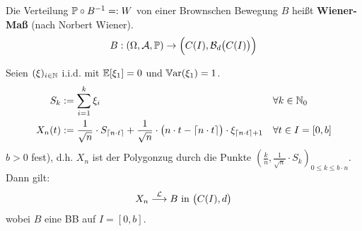 Die Verteilung $\P\circ B^{-1}=:W$ von  einer Brownschen Bewegung $B$ heißt \textbf{Wiener-Maß} (nach Norbert Wiener).
\begin{align*}
	B:(\Omega,\A,\P)\to\Big(C(I),\B_d\big(C(I)\big)\Big)
\end{align*}

\begin{satz}[Donsker]\label{satz7.16Donsker}%
	Seien $(\xi)_{i\in\N}$ i.i.d. mit $\E[\xi_1]=0$ und $\Var(\xi_1)=1$.
	\begin{align*}
		S_k&:=\sum\limits_{i=1}^k\xi_i&\forall& k\in\N_0\\
		X_n(t)&:=\frac{1}{\sqrt{n}}\cdot S_{\lceil n\cdot t\rceil}+\frac{1}{\sqrt{n}}\cdot\big(n\cdot t-\lceil n\cdot t\rceil\big)\cdot\xi_{\lceil n\cdot t\rceil+1} &\forall& t\in I=[0,b]
	\end{align*}
	$b>0$ fest), d.h. $X_n$ ist der Polygonzug durch die Punkte $\left(\frac{k}{n},\frac{1}{\sqrt{n}}\cdot S_k\right)_{0\leq k\leq b\cdot n}$. Dann gilt:
	\begin{align*}
		X_n\stackrel{\L}{\longrightarrow} B\text{ in }\big(C(I),d\big)
	\end{align*}
	wobei $B$ eine BB auf $I=[0,b]$.
\end{satz}

